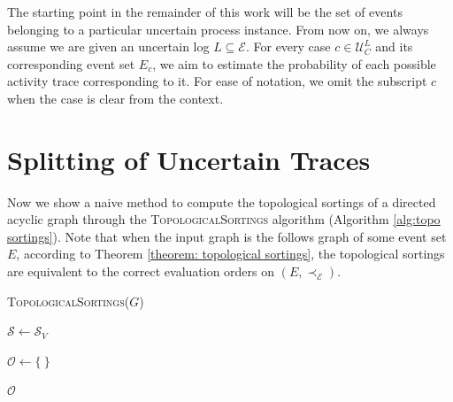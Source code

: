 The starting point in the remainder of this work will be the set of events belonging to a particular uncertain process instance.
From now on, we always assume we are given an uncertain log $L \subseteq \mathcal{E}$.
For every case $c \in \mathcal{U}_C^L$ and its corresponding event set $E_c$, we aim to estimate the probability of each possible activity trace corresponding to it.
For ease of notation, we omit the subscript $c$ when the case is clear from the context.

\section{Splitting of Uncertain Traces}
Now we show a naive method to compute the topological sortings of a directed acyclic graph through the \textsc{TopologicalSortings} algorithm (Algorithm \ref{alg:topo sortings}). 
Note that when the input graph is the follows graph of some event set $E$, according to Theorem \ref{theorem: topological sortings}, the topological sortings are equivalent to the correct evaluation orders on $(E,\prec_{\mathcal{E}})$.

\begin{algorithm}[h!]
	\caption{\textsc{TopologicalSortings($G$)}}
	\label{alg:topo sortings}
	
	$\mathcal{S} \gets \mathcal{S}_V$  \label{2: 1}
	
		
	$\mathcal{O} \gets \{ ~ \}$	
	
	\Return $\mathcal{O}$
	

\end{algorithm}

